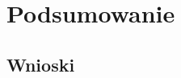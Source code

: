\documentclass[twoside,a4paper]{report}
\begin{document}

\chapter{Podsumowanie}

\section{Wnioski}


\listoffigures
\lstlistoflistings{}

\printbibliography{}

\end{document}
